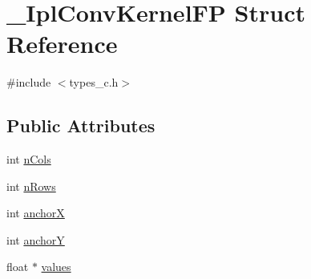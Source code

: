 \hypertarget{struct__IplConvKernelFP}{\section{\-\_\-\-Ipl\-Conv\-Kernel\-F\-P Struct Reference}
\label{struct__IplConvKernelFP}
}


{\ttfamily \#include $<$types\-\_\-c.\-h$>$}

\subsection*{Public Attributes}
\begin{DoxyCompactItemize}
\item 
int \hyperlink{struct__IplConvKernelFP_a61869edd3ab2cc2f59c3c6cc809bf05d}{n\-Cols}
\item 
int \hyperlink{struct__IplConvKernelFP_a1875e5b13135e849ac8f701b328e2dee}{n\-Rows}
\item 
int \hyperlink{struct__IplConvKernelFP_a26d834467c3155173b4fd458bd57d407}{anchor\-X}
\item 
int \hyperlink{struct__IplConvKernelFP_a81e8df32bddad0435612ce88c8b1b2a7}{anchor\-Y}
\item 
float $\ast$ \hyperlink{struct__IplConvKernelFP_a754f41d0794aad5f4d2d067dd034c664}{values}
\end{DoxyCompactItemize}


